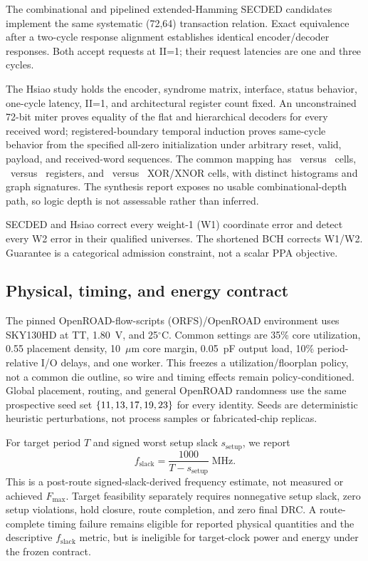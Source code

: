 \documentclass[conference,10pt]{IEEEtran}
\begin{document}
The combinational and pipelined extended-Hamming SECDED candidates implement the same systematic (72,64) transaction relation. Exact equivalence after a two-cycle response alignment establishes identical encoder/decoder responses. Both accept requests at II=1; their request latencies are one and three cycles.

The Hsiao study holds the encoder, syndrome matrix, interface, status behavior, one-cycle latency, II=1, and architectural register count fixed. An unconstrained 72-bit miter proves equality of the flat and hierarchical decoders for every received word; registered-boundary temporal induction proves same-cycle behavior from the specified all-zero initialization under arbitrary reset, valid, payload, and received-word sequences. The common mapping has \MappedFlatCells\ versus \MappedHierCells\ cells, \MappedFlatRegs\ versus \MappedHierRegs\ registers, and \MappedFlatXor\ versus \MappedHierXor\ XOR/XNOR cells, with distinct histograms and graph signatures. The synthesis report exposes no usable combinational-depth path, so logic depth is not assessable rather than inferred.

SECDED and Hsiao correct every weight-1 (W1) coordinate error and detect every W2 error in their qualified universes. The shortened BCH corrects W1/W2. Guarantee is a categorical admission constraint, not a scalar PPA objective.



\subsection{Physical, timing, and energy contract}

The pinned OpenROAD-flow-scripts (ORFS)/OpenROAD environment uses SKY130HD at TT, 1.80~V, and 25$^\circ$C. Common settings are 35\% core utilization, 0.55 placement density, 10~$\mu$m core margin, 0.05~pF output load, 10\% period-relative I/O delays, and one worker. This freezes a utilization/floorplan policy, not a common die outline, so wire and timing effects remain policy-conditioned. Global placement, routing, and general OpenROAD randomness use the same prospective seed set $\{11,13,17,19,23\}$ for every identity. Seeds are deterministic heuristic perturbations, not process samples or fabricated-chip replicas.

For target period $T$ and signed worst setup slack $s_{\mathrm{setup}}$, we report
\begin{equation}
 f_{\mathrm{slack}}=\frac{1000}{T-s_{\mathrm{setup}}}\;\mathrm{MHz}.
 \label{eq:fslack}
\end{equation}
This is a post-route signed-slack-derived frequency estimate, not measured or achieved $F_{\max}$. Target feasibility separately requires nonnegative setup slack, zero setup violations, hold closure, route completion, and zero final DRC. A route-complete timing failure remains eligible for reported physical quantities and the descriptive $f_{\mathrm{slack}}$ metric, but is ineligible for target-clock power and energy under the frozen contract.
\end{document}
